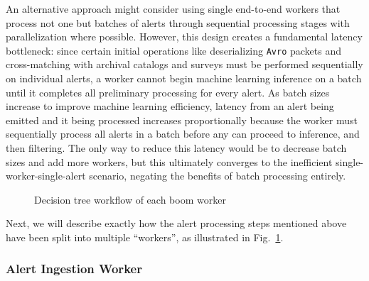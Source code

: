 \documentclass[twocolumn]{aastex631}
\begin{document}
An alternative approach might consider using single end-to-end workers that process not one but batches of alerts through sequential processing stages with parallelization where possible. However, this design creates a fundamental latency bottleneck: since certain initial operations like deserializing \texttt{Avro} packets and cross-matching with archival catalogs and surveys must be performed sequentially on individual alerts, a worker cannot begin machine learning inference on a batch until it completes all preliminary processing for every alert. As batch sizes increase to improve machine learning efficiency, latency from an alert being emitted and it being processed increases proportionally because the worker must sequentially process all alerts in a batch before any can proceed to inference, and then filtering. The only way to reduce this latency would be to decrease batch sizes and add more workers, but this ultimately converges to the inefficient single-worker-single-alert scenario, negating the benefits of batch processing entirely.

\begin{figure}[t]
  \centering
  \resizebox{\textwidth}{!}{}
  \caption{Decision tree workflow of each boom worker}
  \label{fig:workflow}
\end{figure}

Next, we will describe exactly how the alert processing steps mentioned above have been split into multiple ``workers'', as illustrated in Fig.~\ref{fig:workflow}.

\subsubsection{Alert Ingestion Worker}
\end{document}
